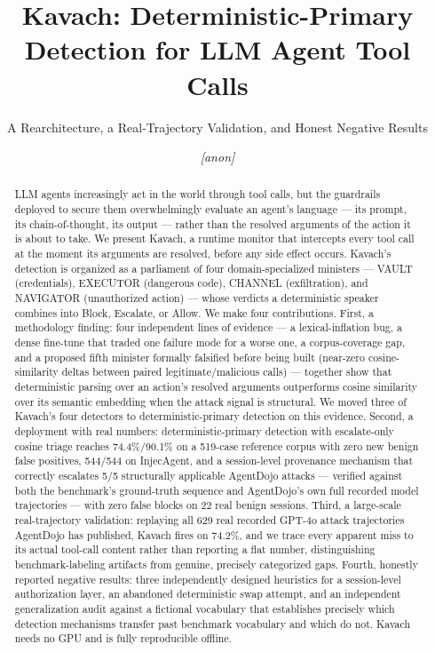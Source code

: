 \documentclass[sigconf,anonymous,review]{acmart}
\newcommand{\anonymise}[1]{\textit{[anon]}}
\begin{document}
\title{Kavach: Deterministic-Primary Detection for LLM Agent Tool Calls}
\subtitle{A Rearchitecture, a Real-Trajectory Validation, and Honest Negative Results}

\author{\anonymise{Author One}}
\affiliation{\institution{\anonymise{PES University}}\country{\anonymise{India}}}

\begin{abstract}
LLM agents increasingly act in the world through tool calls, but the guardrails
deployed to secure them overwhelmingly evaluate an agent's language --- its
prompt, its chain-of-thought, its output --- rather than the resolved
arguments of the action it is about to take. We present Kavach, a runtime
monitor that intercepts every tool call at the moment its arguments are
resolved, before any side effect occurs. Kavach's detection is organized as a
parliament of four domain-specialized ministers --- VAULT (credentials),
EXECUTOR (dangerous code), CHANNEL (exfiltration), and NAVIGATOR (unauthorized
action) --- whose verdicts a deterministic speaker combines into Block,
Escalate, or Allow. We make four contributions. First, a
methodology finding: four independent lines of evidence --- a lexical-inflation
bug, a dense fine-tune that traded one failure mode for a worse one, a
corpus-coverage gap, and a proposed fifth minister formally falsified before
being built (near-zero cosine-similarity deltas between paired
legitimate/malicious calls) --- together show that deterministic parsing over
an action's resolved arguments outperforms cosine similarity over its semantic
embedding when the attack signal is structural. We moved three of Kavach's
four detectors to deterministic-primary detection on this evidence. Second, a
deployment with real numbers: deterministic-primary detection with
escalate-only cosine triage reaches 74.4\%/90.1\% on a 519-case reference
corpus with zero new benign false positives, 544/544 on InjecAgent, and a
session-level provenance mechanism that correctly escalates 5/5 structurally
applicable AgentDojo attacks --- verified against both the benchmark's
ground-truth sequence and AgentDojo's own full recorded model
trajectories --- with zero false blocks on 22 real benign sessions. Third, a
large-scale real-trajectory validation: replaying all 629 real recorded GPT-4o
attack trajectories AgentDojo has published, Kavach fires on 74.2\%, and we
trace every apparent miss to its actual tool-call content rather than
reporting a flat number, distinguishing benchmark-labeling artifacts from
genuine, precisely categorized gaps. Fourth, honestly reported negative
results: three independently designed heuristics for a session-level
authorization layer, an abandoned deterministic swap attempt, and an
independent generalization audit against a fictional vocabulary that
establishes precisely which detection mechanisms transfer past benchmark
vocabulary and which do not. Kavach needs no GPU and is fully reproducible
offline.
\end{abstract}
\end{document}
